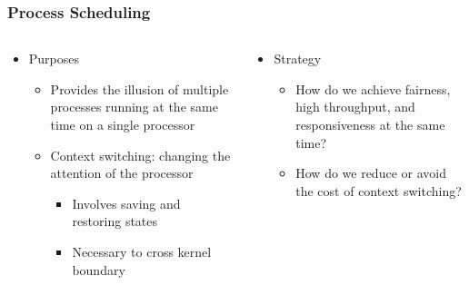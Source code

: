 \begin{frame}[t]
	\frametitle{Process Scheduling}
	\begin{columns}[t]
		\begin{column}{.5\textwidth}
			
			\begin{itemize}\Large
				\item Purposes
				\begin{itemize}\large
					\item Provides the illusion of multiple
					processes running at the same
					time on a single processor
					\item Context switching: changing the
					attention of the processor
					\begin{itemize}\large
						\item Involves saving and restoring
						states
						\item Necessary to cross kernel
						boundary
					\end{itemize}
				\end{itemize}
			\end{itemize}
			
		\end{column}
		
		\begin{column}{.5\textwidth}
			
			\begin{itemize}\Large
				\item Strategy
				\begin{itemize}\large
					\item How do we achieve fairness,
					high throughput, and
					responsiveness at the same
					time?
					\item How do we reduce or avoid the
					cost of context switching?
					
				\end{itemize}
			\end{itemize}
			
		\end{column}
	\end{columns}
\end{frame}

